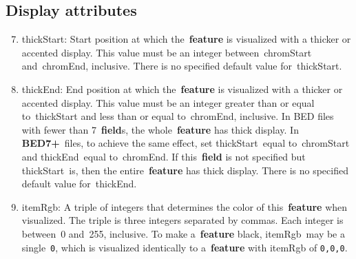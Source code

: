 \documentclass[11pt]{article}
\begin{document}
\subsection{Display attributes}
\begin{enumerate}
  \setcounter{enumi}{6}

\item \textsf{thickStart}: Start position at which the~\textbf{feature} is visualized with a thicker or accented display.
  This value must be an integer between~\textsf{chromStart} and~\textsf{chromEnd}, inclusive.
  There is no specified default value for~\textsf{thickStart}.

\item \textsf{thickEnd}: End position at which the~\textbf{feature} is visualized with a thicker or accented display.
  This value must be an integer greater than or equal to~\textsf{thickStart} and less than or equal to~\textsf{chromEnd}, inclusive.
  In \ac{BED} files with fewer than 7~\textbf{field}s, the whole~\textbf{feature} has thick display.
  In \textbf{BED7+}~files, to achieve the same effect, set \textsf{thickStart}~equal to~\textsf{chromStart} and \textsf{thickEnd}~equal to~\textsf{chromEnd}.
  If this~\textbf{field} is not specified but \textsf{thickStart}~is, then the entire~\textbf{feature} has thick display.
  There is no specified default value for~\textsf{thickEnd}.

\item \textsf{itemRgb}: A triple of integers that determines the color of this~\textbf{feature} when visualized.
  The triple is three integers separated by commas.
  Each integer is between~0 and~255, inclusive.
  To make a~\textbf{feature} black, \textsf{itemRgb}~may be a single~\texttt{0}, which is visualized identically to a~\textbf{feature} with \textsf{itemRgb} of \texttt{0,0,0}.
\end{enumerate}
\end{document}
